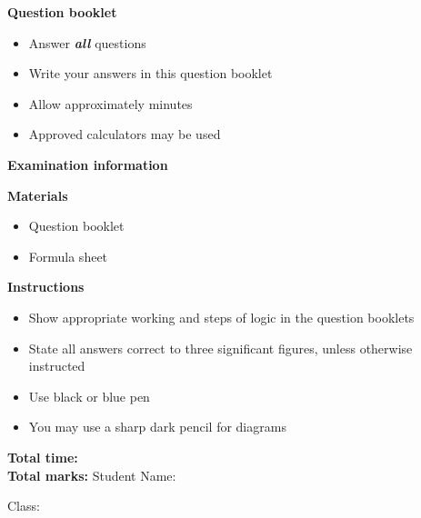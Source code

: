 \begin{coverpages}
{    \vspace{1cm}
    \textbf{Question booklet}
    \begin{itemize}
        \item Answer \textbf{\textit{all}} questions
        \item Write your answers in this question booklet
        \item Allow approximately \totaltime minutes
        \item Approved calculators may be used
    \end{itemize}
    \vfill
    \textbf{Examination information}\par
    \textbf{Materials}
    \begin{itemize}
        \item Question booklet
        \item Formula sheet
    \end{itemize}
    \textbf{Instructions}
    \begin{itemize}
        \item Show appropriate working and steps of logic in the question booklets
        \item State all answers correct to three significant figures, unless otherwise instructed
        \item Use black or blue pen
        \item You may use a sharp dark pencil for diagrams
    \end{itemize}
    \textbf{Total time:} \totaltime\\
    \textbf{Total marks:} \numpoints
    \vfill
    Student Name:\ \parbox[b][2em][b]{6cm}{\dotfill}
    \hfill
    Class:\ \parbox[b][2em][b]{5cm}{\dotfill}
}
\end{coverpages}
\addtocounter{page}{1}

